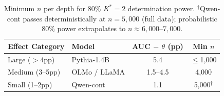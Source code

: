 \documentclass[11pt,a4paper]{article}
\newcommand{\Kstar}{K^{*}}
\begin{document}
\begin{table}[t]
\centering
\small
\begin{tabular}{llcc}
\toprule
\textbf{Effect Category} & \textbf{Model} & \textbf{AUC $-$ $\theta$ (pp)} & \textbf{Min $n$} \\
\midrule
Large ($>$4pp) & Pythia-1.4B & 5.4 & $\leq$1,000 \\
Medium (3--5pp) & OLMo / LLaMA & 1.5--4.5 & 4,000 \\
Small (1--2pp) & Qwen-cont & 1.1 & 5,000$^\dagger$ \\
\bottomrule
\end{tabular}
\caption{Minimum $n$ per depth for 80\% $\Kstar = 2$ determination power. $^\dagger$Qwen-cont passes deterministically at $n = 5{,}000$ (full data); probabilistic 80\% power extrapolates to $n \approx 6{,}000$--$7{,}000$.}
\label{tab:power-min}
\end{table}
\end{document}
